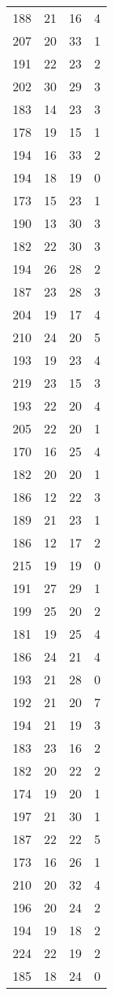 \documentclass{article}
\begin{document}
\begin{center}
\begin{longtable}{|c|c|c|c|}
188 & 21 & 16 & 4 \\
207 & 20 & 33 & 1 \\
191 & 22 & 23 & 2 \\
202 & 30 & 29 & 3 \\
183 & 14 & 23 & 3 \\
178 & 19 & 15 & 1 \\
194 & 16 & 33 & 2 \\
194 & 18 & 19 & 0 \\
173 & 15 & 23 & 1 \\
190 & 13 & 30 & 3 \\
182 & 22 & 30 & 3 \\
194 & 26 & 28 & 2 \\
187 & 23 & 28 & 3 \\
204 & 19 & 17 & 4 \\
210 & 24 & 20 & 5 \\
193 & 19 & 23 & 4 \\
219 & 23 & 15 & 3 \\
193 & 22 & 20 & 4 \\
205 & 22 & 20 & 1 \\
170 & 16 & 25 & 4 \\
182 & 20 & 20 & 1 \\
186 & 12 & 22 & 3 \\
189 & 21 & 23 & 1 \\
186 & 12 & 17 & 2 \\
215 & 19 & 19 & 0 \\
191 & 27 & 29 & 1 \\
199 & 25 & 20 & 2 \\
181 & 19 & 25 & 4 \\
186 & 24 & 21 & 4 \\
193 & 21 & 28 & 0 \\
192 & 21 & 20 & 7 \\
194 & 21 & 19 & 3 \\
183 & 23 & 16 & 2 \\
182 & 20 & 22 & 2 \\
174 & 19 & 20 & 1 \\
197 & 21 & 30 & 1 \\
187 & 22 & 22 & 5 \\
173 & 16 & 26 & 1 \\
210 & 20 & 32 & 4 \\
196 & 20 & 24 & 2 \\
194 & 19 & 18 & 2 \\
224 & 22 & 19 & 2 \\
185 & 18 & 24 & 0 \\

\end{longtable}
\end{center}
\end{document}

